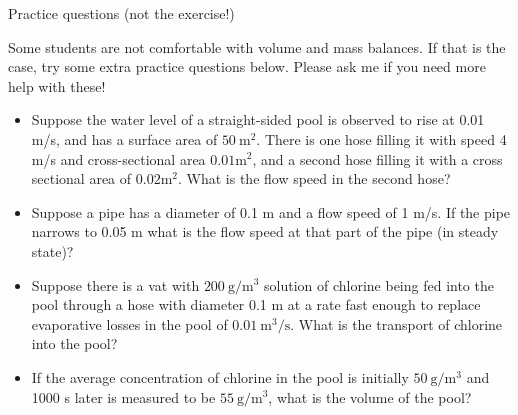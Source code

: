 \clearpage
\begin{derivbox}[label={box:practicevolume}]{Practice questions (not the exercise!)}

Some students are not comfortable with volume and mass balances.  If
that is the case, try some extra practice questions below. Please ask
me if you need more help with these!
\begin{itemize}
    \item Suppose the water level of a straight-sided pool is observed to rise
at 0.01 m/s, and has a surface area of $50\ \mathrm{m^2}$.  There is one
hose filling it with speed 4 m/s and cross-sectional area $0.01 \mathrm{m}^2$,
and a second hose filling it with a cross sectional area of $0.02 \mathrm{m}^2$.
What is the flow speed in the second hose?
    \item Suppose a pipe has a diameter of 0.1 m and a flow speed of 1 m/s.  If the pipe narrows to 0.05 m what is the flow speed at that part of the pipe (in steady state)?
    \item Suppose there is a vat with $200\ \mathrm{g/m^3}$ solution of chlorine being fed into the pool through a hose with diameter 0.1 m at a rate fast enough to replace evaporative losses in the pool of $0.01\ \mathrm{m^3/s}$.  What is the transport of chlorine into the pool?
    \item If the average concentration of chlorine in the pool is initially $50\ \mathrm{g/m^3}$ and 1000 s later is measured to be $55\ \mathrm{g/m^3}$, what is the volume of the pool?
\end{itemize}







\end{derivbox}
